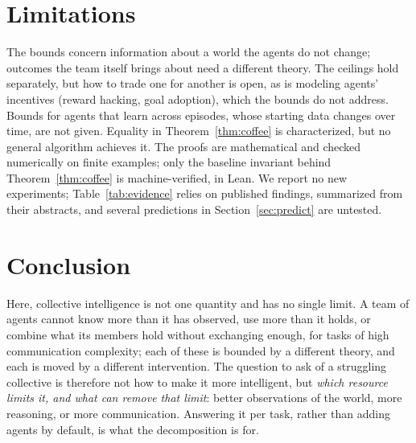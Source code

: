 \documentclass[conference]{IEEEtran}
\theoremstyle{definition}
\begin{document}
\section{Limitations}

The bounds concern information about a world the agents do not change; outcomes
the team itself brings about need a different theory. The ceilings hold
separately, but how to trade one for another is open, as is modeling agents'
incentives (reward hacking, goal adoption), which the bounds do not address.
Bounds for agents that learn across episodes, whose starting data changes over
time, are not given. Equality in Theorem~\ref{thm:coffee} is characterized, but no
general algorithm achieves it. The proofs are mathematical and checked
numerically on finite examples; only the baseline invariant behind
Theorem~\ref{thm:coffee} is machine-verified, in Lean. We report no new
experiments; Table~\ref{tab:evidence} relies on published findings, summarized
from their abstracts, and several predictions in Section~\ref{sec:predict} are
untested.

\section{Conclusion}

Here, collective intelligence is not one quantity and has no single limit. A
team of agents cannot know more than it has observed, use more than it holds, or
combine what its members hold without exchanging enough, for tasks of high
communication complexity; each of these is bounded
by a different theory, and each is moved by a different intervention. The
question to ask of a struggling collective is therefore not how to make it more
intelligent, but \emph{which resource limits it, and what can remove that limit}:
better observations of the world, more reasoning, or more communication. Answering
it per task, rather than adding agents by default, is what the decomposition is
for.



\end{document}
